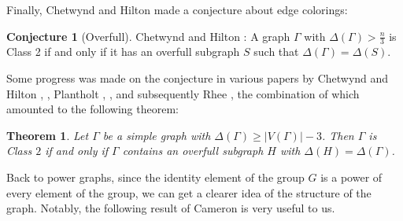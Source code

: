 \documentclass{article}
\newtheorem{theorem}{Theorem}[section]
\newtheorem{proposition}[theorem]{Proposition}
\theoremstyle{definition}
\theoremstyle{indentclaim}
\theoremstyle{named}
\theoremstyle{named}
\newtheorem*{namedconjecture}{Conjecture}
\begin{document}
Finally, Chetwynd and Hilton made a conjecture about edge colorings: 

\begin{namedconjecture}[Overfull]Chetwynd and Hilton \cite{C-H-conjecture}:
    A graph \( \Gamma \) with \( \Delta(\Gamma) > \frac{n}{3} \) is Class 2 if and only if it has an overfull subgraph \( S \) such that \( \Delta(\Gamma) = \Delta(S) \).
\end{namedconjecture}

Some progress was made on the conjecture in various papers by Chetwynd and Hilton \cite{C-H-3}, \cite{C-H_other}, Plantholt \cite{Plantholt-1}, \cite{Plantholt_even}, and subsequently Rhee \cite{Rhee}, the combination of which amounted to the following theorem: 
 
\begin{theorem}\label{overfull proven part}
    Let $\Gamma$ be a simple graph with $\Delta(\Gamma) \geq |V(\Gamma)| - 3$. Then $\Gamma$ is Class $2$ if and only if $\Gamma$ contains an overfull subgraph $H$ with $\Delta(H) = \Delta(\Gamma)$. 
\end{theorem}

\bigskip

Back to power graphs, since the identity element of the group $G$ is a power of every element of the group, we can get a clearer idea of the structure of the graph. Notably, the following result of Cameron is very useful to us. 

\end{document}

